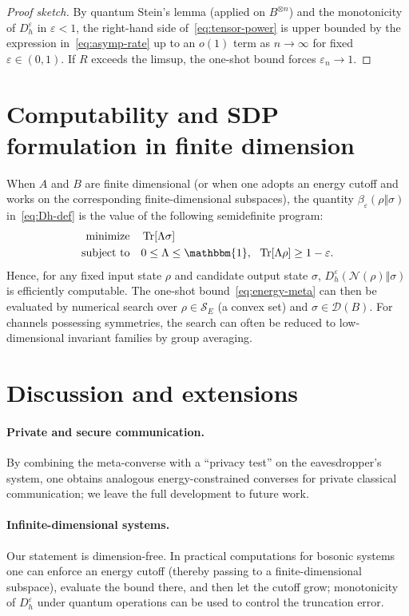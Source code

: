 \documentclass[11pt]{article}
\theoremstyle{definition}
\DeclareMathOperator{\Tr}{Tr}
\newcommand{\id}{\mathbbm{1}}
\newcommand{\Dheps}[1]{D_h^{#1}}
\newcommand{\calN}{\mathcal{N}}
\newcommand{\calD}{\mathcal{D}}
\newcommand{\calS}{\mathcal{S}}
\begin{document}
\begin{proof}[Proof sketch]
By quantum Stein's lemma (applied on $B^{\otimes n}$) and the monotonicity of $\Dheps{\varepsilon}$ in $\varepsilon<1$, the right-hand side of~\eqref{eq:tensor-power} is upper bounded by the expression in~\eqref{eq:asymp-rate} up to an $o(1)$ term as $n\to\infty$ for fixed $\varepsilon\in(0,1)$.
If $R$ exceeds the limsup, the one-shot bound forces $\varepsilon_n\to 1$.
\end{proof}

\section{Computability and SDP formulation in finite dimension}
When $A$ and $B$ are finite dimensional (or when one adopts an energy cutoff and works on the corresponding finite-dimensional subspaces), the quantity $\beta_\varepsilon(\rho\Vert\sigma)$ in~\eqref{eq:Dh-def} is the value of the following semidefinite program:
\begin{align}
\text{minimize}\quad & \Tr[\Lambda \sigma] \nonumber\\
\text{subject to}\quad & 0\le \Lambda \le \id,\ \ \Tr[\Lambda \rho] \ge 1-\varepsilon. \label{eq:beta-sdp}
\end{align}
Hence, for any fixed input state $\rho$ and candidate output state $\sigma$, $\Dheps{\varepsilon}(\calN(\rho)\Vert\sigma)$ is efficiently computable.
The one-shot bound~\eqref{eq:energy-meta} can then be evaluated by numerical search over $\rho\in\calS_E$ (a convex set) and $\sigma\in\calD(B)$.
For channels possessing symmetries, the search can often be reduced to low-dimensional invariant families by group averaging.

\section{Discussion and extensions}
\paragraph{Private and secure communication.}
By combining the meta-converse with a ``privacy test'' on the eavesdropper's system, one obtains analogous energy-constrained converses for private classical communication; we leave the full development to future work.

\paragraph{Infinite-dimensional systems.}
Our statement is dimension-free. In practical computations for bosonic systems one can enforce an energy cutoff (thereby passing to a finite-dimensional subspace), evaluate the bound there, and then let the cutoff grow; monotonicity of $\Dheps{\varepsilon}$ under quantum operations can be used to control the truncation error.
\end{document}
